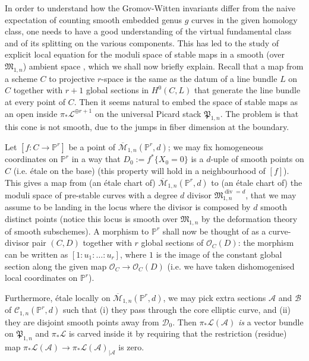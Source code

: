 \documentclass[11pt]{amsart}
\newcommand{\M}[4]{\overline{\mathcal M}_{#1,#2}(#3,#4)}
\newcommand{\PP}{\mathbb P}
\renewcommand{\to}{\rightarrow}
\theoremstyle{plain}
\theoremstyle{definition}
\begin{document}
In order to understand how the Gromov-Witten invariants differ from the naive expectation of counting smooth embedded genus $g$ curves in the given homology class, one needs to have a good understanding of the virtual fundamental class and of its splitting on the various components. 
This has led to the study of explicit local equation for the moduli space of stable maps in a smooth (over $\mathfrak M_{1,n}$) ambient space \cite{HL}, which we shall now briefly explain. Recall that a map from a scheme $C$ to projective $r$-space is the same as the datum of a line bundle $L$ on $C$ together with $r+1$ global sections in $H^0(C,L)$ that generate the line bundle at every point of $C$. Then it seems natural to embed the space of stable maps as an open inside $\pi_*\mathcal L^{\oplus r+1}$ on the universal Picard stack $\mathfrak{P}_{1,n}$. The problem is that this cone is not smooth, due to the jumps in fiber dimension at the boundary.

Let $[f\colon C\to \PP^r]$ be a point of $\M{1}{n}{\PP^r}{d}$; we may fix homogeneous coordinates on $\PP^r$ in a way that $D_0:=f^*\{X_0=0\}$ is a $d$-uple of smooth points on $C$ (i.e. \'{e}tale on the base) (this property will hold in a neighbourhood of $[f]$). This gives a map from (an \'{e}tale chart of) $\M{1}{n}{\PP^r}{d}$ to (an \'{e}tale chart of) the moduli space of pre-stable curves with a degree $d$ divisor $\mathfrak M_{1,n}^{\operatorname{div}=d}$, that we may assume to be landing in the locus where the divisor is composed by $d$ smooth distinct points (notice this locus is smooth over $\mathfrak M_{1,n}$ by the deformation theory of smooth subschemes). A morphism to $\PP^r$ shall now be thought of as a curve-divisor pair $(C,D)$ together with $r$ global sections of $\mathcal O_C(D)$: the morphism can be written as $[1:u_1:\ldots:u_r]$, where $1$ is the image of the constant global section along the given map $\mathcal O_C\to\mathcal O_C(D)$ (i.e. we have taken dishomogenised local coordinates on $\PP^r$).

Furthermore, \'{e}tale locally on $\M{1}{n}{\PP^r}{d}$, we may pick extra sections $\mathcal A$ and $\mathcal B$ of $\mathcal C_{1,n}(\PP^r,d)$ such that (i) they pass through the core elliptic curve, and (ii) they are disjoint smooth points away from $\mathcal D_0$. Then $\pi_*\mathcal L(\mathcal A)$ \emph{is} a vector bundle on $\mathfrak P_{1,n}$ and $\pi_*\mathcal L$ is carved inside it by requiring that the restriction (residue) map $\pi_*\mathcal L(\mathcal A)\to\pi_*\mathcal L(\mathcal A)_{|\mathcal A}$ is zero.
\end{document}
